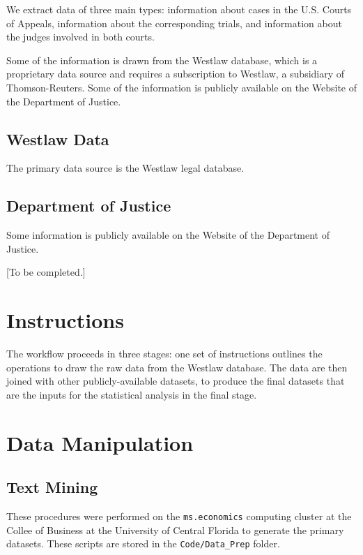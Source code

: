 \documentclass[11pt]{paper}
\begin{document}
We extract data of three main types: 
information about cases in the U.S. Courts of Appeals, 
information about the corresponding trials, 
and information about the judges involved in both courts. 

Some of the information is drawn from the Westlaw database, which is a proprietary data source
and requires a subscription to Westlaw, a subsidiary of Thomson-Reuters. 
Some of the information is publicly available on the Website of the Department of Justice. 

\subsection*{Westlaw Data}

The primary data source is the Westlaw legal database. 




\subsection*{Department of Justice}

Some information is publicly available on the Website of the Department of Justice. 

[To be completed.]





\section*{Instructions}

The workflow proceeds in three stages: 
one set of instructions outlines the operations to draw the raw data from the 
Westlaw database. 
The data are then joined with other publicly-available datasets, 
to produce the final datasets that are the inputs for the statistical analysis
in the final stage. 


\section*{Data Manipulation}



\subsection{Text Mining}

These procedures were performed 
on the \texttt{ms.economics} computing cluster
at the Collee of Business
at the University of Central Florida
to generate the primary datasets. 
These scripts are stored in the \texttt{Code/Data\_Prep} folder. 
\end{document}
